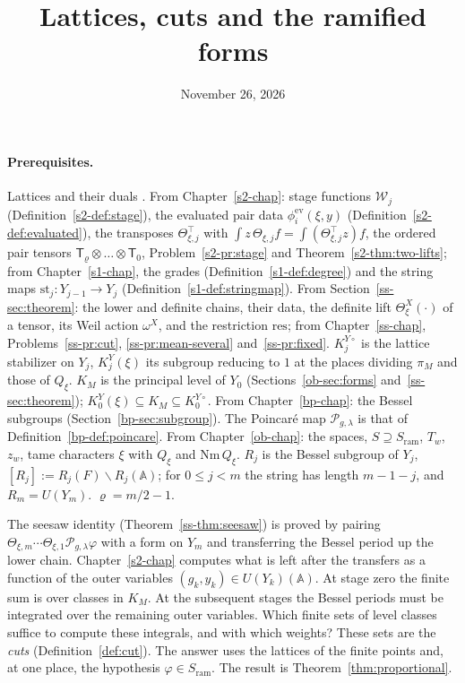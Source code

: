 \documentclass[reqno]{amsart}
\title{Lattices, cuts and the ramified forms}
\author{}
\date{November 26, 2026}
\newcounter{chap}
\theoremstyle{definition}
\theoremstyle{plain}
\theoremstyle{remark}
\newcommand{\A}{\mathbb{A}}
\newcommand{\Pc}{\mathcal{P}}
\newcommand{\Wc}{\mathcal{W}}
\newcommand{\st}{\mathrm{st}}
\newcommand{\ev}{\mathrm{ev}}
\newcommand{\res}{\mathrm{res}}
\newcommand{\Sr}{S_{\mathrm{ram}}}
\newcommand{\Nm}{\mathrm{Nm}\,}
\newcommand{\KYo}[1]{K^{Y\circ}_{#1}}
\newcommand{\KY}[1]{K^{Y}_{#1}(\xi)}
\begin{document}
\maketitle
{}\label{chap}

\paragraph{Prerequisites.}
Lattices and their duals \cite{OM}.  From Chapter~\ref{s2-chap}: stage functions \(\Wc_j\) (Definition~\ref{s2-def:stage}), the evaluated pair data \(\phi^{\ev}_i(\xi,y)\) (Definition~\ref{s2-def:evaluated}), the transposes \(\Theta^\top_{\xi,j}\) with \(\int z\,\Theta_{\xi,j}f=\int(\Theta^\top_{\xi,j}z)f\), the ordered pair tensors \(\mathsf T_\varrho\otimes\dots\otimes\mathsf T_0\), Problem~\ref{s2-pr:stage} and Theorem~\ref{s2-thm:two-lifts}; from Chapter~\ref{s1-chap}, the grades (Definition~\ref{s1-def:degree}) and the string maps \(\st_j\colon Y_{j-1}\to Y_j\) (Definition~\ref{s1-def:stringmap}).  From Section~\ref{ss-sec:theorem}: the lower and definite chains, their data, the definite lift \(\Theta^X_\xi(\cdot)\) of a tensor, its Weil action \(\omega^X\), and the restriction \(\res\); from Chapter~\ref{ss-chap}, Problems~\ref{ss-pr:cut}, \ref{ss-pr:mean-several} and~\ref{ss-pr:fixed}.  \(\KYo j\) is the lattice stabilizer on \(Y_j\), \(\KY j\) its subgroup reducing to \(1\) at the places dividing \(\pi_M\) and those of \(Q_\xi\).  \(K_M\) is the principal level of \(Y_0\) (Sections~\ref{ob-sec:forms} and~\ref{ss-sec:theorem}); \(\KY0\subseteq K_M\subseteq\KYo0\).  From Chapter~\ref{bp-chap}: the Bessel subgroups (Section~\ref{bp-sec:subgroup}).  The Poincar\'e map \(\Pc_{g,\lambda}\) is that of Definition~\ref{bp-def:poincare}.  From Chapter~\ref{ob-chap}: the spaces, \(S\supseteq\Sr\), \(T_w\), \(z_w\), tame characters \(\xi\) with \(Q_\xi\) and \(\Nm Q_\xi\).  \(R_j\) is the Bessel subgroup of \(Y_j\), \([R_j]:=R_j(F)\backslash R_j(\A)\); for \(0\le j<m\) the string has length \(m-1-j\), and \(R_m=U(Y_m)\).  \(\varrho=m/2-1\).

\medskip
The seesaw identity (Theorem~\ref{ss-thm:seesaw}) is proved by pairing \(\Theta_{\xi,m}\cdots\Theta_{\xi,1}\Pc_{g,\lambda}\varphi\) with a form on \(Y_m\) and transferring the Bessel period up the lower chain.  Chapter~\ref{s2-chap} computes what is left after the transfers as a function of the outer variables \((g_k,y_k)\in U(Y_k)(\A)\).  At stage zero the finite sum is over classes in \(K_M\).  At the subsequent stages the Bessel periods must be integrated over the remaining outer variables.  Which finite sets of level classes suffice to compute these integrals, and with which weights?  These sets are the \emph{cuts} (Definition~\ref{def:cut}).  The answer uses the lattices of the finite points and, at one place, the hypothesis \(\varphi\in\Sr\).  The result is Theorem~\ref{thm:proportional}.
\end{document}
